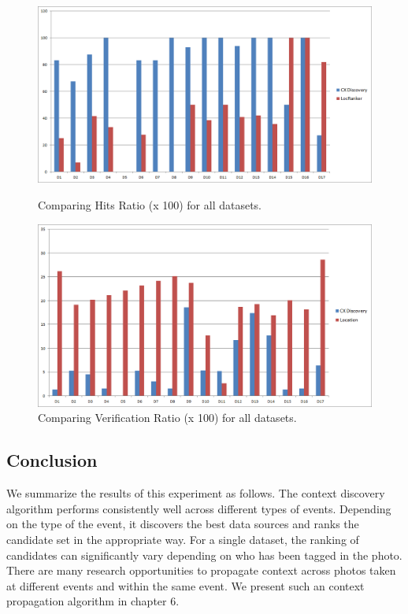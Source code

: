 \begin{figure}[h!]

\begin{minipage}[b]{\linewidth}
\centering
\includegraphics[width=\textwidth]{media/chapter5/hits-ratio-comparison-all-datasets.png}
\end{minipage}
\caption{Comparing Hits Ratio (x 100) for all datasets.}
\label{fig:hits-ratio-comparison}

\vspace{0.5cm}

\begin{minipage}[b]{\linewidth}
\centering
\includegraphics[width=\textwidth]{media/chapter5/verification-ratio-comparison-all-datasets.png}
\end{minipage}
\caption{Comparing Verification Ratio (x 100) for all datasets.}
\label{fig:verification-ratio-comparison}

\end{figure}

\subsection{Conclusion}
We summarize the results of this experiment as follows. The context discovery algorithm performs consistently well across different types of events. Depending on the type of the event, it discovers the best data sources and ranks the candidate set in the appropriate way. For a single dataset, the ranking of candidates can significantly vary depending on who has been tagged in the photo. There are many research opportunities to propagate context across photos taken at different events and within the same event. We present such an context propagation algorithm in chapter 6.

